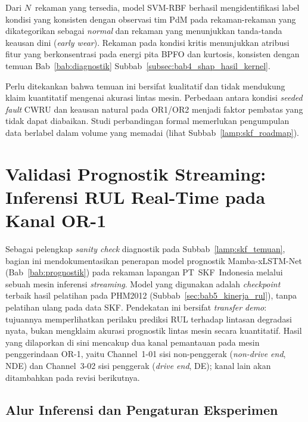 Dari $N$~rekaman yang tersedia, model SVM-RBF berhasil
mengidentifikasi label kondisi yang konsisten dengan observasi tim
PdM pada rekaman-rekaman yang dikategorikan sebagai \emph{normal}
dan rekaman yang menunjukkan tanda-tanda keausan dini (\emph{early
wear}). Rekaman pada kondisi kritis menunjukkan atribusi fitur
yang berkonsentrasi pada energi pita BPFO dan kurtosis, konsisten
dengan temuan Bab~\ref{bab:diagnostik} Subbab~\ref{subsec:bab4_shap_hasil_kernel}.

Perlu ditekankan bahwa temuan ini bersifat kualitatif dan tidak
mendukung klaim kuantitatif mengenai akurasi lintas mesin. Perbedaan
antara kondisi \emph{seeded fault} CWRU dan keausan natural pada OR1/OR2
menjadi faktor pembatas yang tidak dapat diabaikan. Studi perbandingan
formal memerlukan pengumpulan data berlabel dalam volume yang memadai
(lihat Subbab~\ref{lamp:skf_roadmap}).

\section{{\color{blue}Validasi Prognostik Streaming: Inferensi RUL Real-Time pada Kanal OR-1}}
\label{lamp:skf_prognostik}

{\color{blue}Sebagai pelengkap \emph{sanity check} diagnostik pada Subbab~\ref{lamp:skf_temuan},
bagian ini mendokumentasikan penerapan model prognostik Mamba-xLSTM-Net
(Bab~\ref{bab:prognostik}) pada rekaman lapangan PT~SKF~Indonesia melalui sebuah
mesin inferensi \emph{streaming}. Model yang digunakan adalah \emph{checkpoint}
terbaik hasil pelatihan pada PHM2012 (Subbab~\ref{sec:bab5_kinerja_rul}), tanpa
pelatihan ulang pada data SKF. Pendekatan ini bersifat \emph{transfer demo}:
tujuannya memperlihatkan perilaku prediksi RUL terhadap lintasan degradasi
nyata, bukan mengklaim akurasi prognostik lintas mesin secara kuantitatif.
Hasil yang dilaporkan di sini mencakup dua kanal pemantauan pada mesin
penggerindaan OR-1, yaitu Channel~1-01 sisi non-penggerak (\emph{non-drive end},
NDE) dan Channel~3-02 sisi penggerak (\emph{drive end}, DE); kanal lain akan
ditambahkan pada revisi berikutnya.}

{\color{blue}\subsection{Alur Inferensi dan Pengaturan Eksperimen}}
\label{lamp:skf_prognostik_setup}

